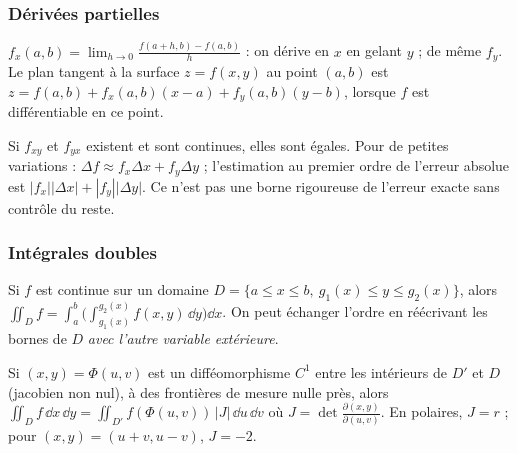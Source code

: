 \subsubsection*{Dérivées partielles}
\begin{definition}
$f_x(a,b)=\lim_{h\to0}\frac{f(a+h,b)-f(a,b)}h$ : on dérive en $x$ en gelant $y$ ; de même $f_y$. Le plan tangent à la surface $z=f(x,y)$ au point $(a,b)$ est $z=f(a,b)+f_x(a,b)(x-a)+f_y(a,b)(y-b)$, lorsque $f$ est différentiable en ce point.
\end{definition}
\begin{propriete}
Si $f_{xy}$ et $f_{yx}$ existent et sont continues, elles sont égales. Pour de petites variations : $\Delta f\approx f_x\Delta x+f_y\Delta y$ ; l'estimation au premier ordre de l'erreur absolue est $|f_x||\Delta x|+|f_y||\Delta y|$. Ce n'est pas une borne rigoureuse de l'erreur exacte sans contrôle du reste.
\end{propriete}
\subsubsection*{Intégrales doubles}
\begin{propriete}[Fubini]
Si $f$ est continue sur un domaine $D=\{a\le x\le b,\ g_1(x)\le y\le g_2(x)\}$, alors $\iint_Df=\int_a^b\Big(\int_{g_1(x)}^{g_2(x)}f(x,y)\,\dd y\Big)\dd x$. On peut échanger l'ordre en réécrivant les bornes de $D$ \emph{avec l'autre variable extérieure}.
\end{propriete}
\begin{propriete}
Si $(x,y)=\Phi(u,v)$ est un difféomorphisme $C^1$ entre les intérieurs de $D'$ et $D$ (jacobien non nul), à des frontières de mesure nulle près, alors $\iint_Df\,\dd x\,\dd y=\iint_{D'}f(\Phi(u,v))\,|J|\,\dd u\,\dd v$ où $J=\det\frac{\partial(x,y)}{\partial(u,v)}$. En polaires, $J=r$ ; pour $(x,y)=(u+v,u-v)$, $J=-2$.
\end{propriete}
